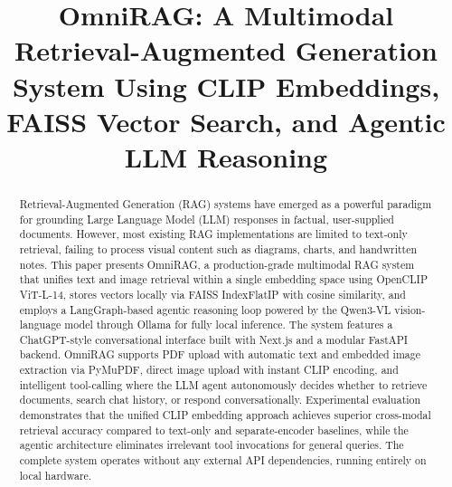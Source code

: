 \documentclass[conference]{IEEEtran}
\begin{document}
\title{OmniRAG: A Multimodal Retrieval-Augmented Generation System Using CLIP Embeddings, FAISS Vector Search, and Agentic LLM Reasoning}

\author{
}

\maketitle
\thispagestyle{empty}

\begin{abstract}
Retrieval-Augmented Generation (RAG) systems have emerged as a powerful paradigm for grounding Large Language Model (LLM) responses in factual, user-supplied documents. However, most existing RAG implementations are limited to text-only retrieval, failing to process visual content such as diagrams, charts, and handwritten notes. This paper presents OmniRAG, a production-grade multimodal RAG system that unifies text and image retrieval within a single embedding space using OpenCLIP ViT-L-14, stores vectors locally via FAISS IndexFlatIP with cosine similarity, and employs a LangGraph-based agentic reasoning loop powered by the Qwen3-VL vision-language model through Ollama for fully local inference. The system features a ChatGPT-style conversational interface built with Next.js and a modular FastAPI backend. OmniRAG supports PDF upload with automatic text and embedded image extraction via PyMuPDF, direct image upload with instant CLIP encoding, and intelligent tool-calling where the LLM agent autonomously decides whether to retrieve documents, search chat history, or respond conversationally. Experimental evaluation demonstrates that the unified CLIP embedding approach achieves superior cross-modal retrieval accuracy compared to text-only and separate-encoder baselines, while the agentic architecture eliminates irrelevant tool invocations for general queries. The complete system operates without any external API dependencies, running entirely on local hardware.
\end{abstract}
\end{document}
